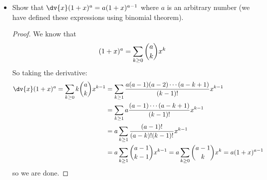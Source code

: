 \documentclass{article}
\begin{document}
\begin{itemize}
\begin{proof}
\begin{align*}
                                          &= \sum_{i \geq 0}\sum_{j \geq 1}^{i} (j)a_{j}b_{i - j + 1}x^{i}
                    \end{align*}
                so 
                    \begin{align*}
                        F(x)G^{\prime}(x) + F^{\prime}(x)G(x) &= \sum_{i \geq 0}\sum_{j \geq 0}^{i}(i - j + 1)a_{j}b_{i - j + 1}x^{i} + \sum_{i \geq 0}\sum_{j \geq 1}^{i}(j)a_{j}b_{i - j + 1}x^{i} \\
                        &= \sum_{i \geq 0}\sum_{j \geq 0}^{i}(i + 1)a_{j}b_{i - j + 1}x^{i} \\
                        &= \sum_{i \geq 0}\sum_{j \geq 0}^{i} (i)a_{j}b_{i - j}x^{i - 1} = \dv{x}F(x)G(x)
                    \end{align*}
                so we are done.
            \end{proof}


        \item Show that $\dv{x}(1 + x)^{a} = a(1 + x)^{a - 1}$ where $a$ is an arbitrary number (we have defined these expressions using binomial theorem). 
            \begin{proof}
                We know that 
                    \begin{equation*}
                        (1 + x)^{a} = \sum_{k \geq 0} \dbinom{a}{k} x^{k}
                    \end{equation*}
                So taking the derivative:
                    \begin{align*}
                        \dv{x}(1 + x)^{a} = \sum_{k \geq 0}k\dbinom{a}{k}x^{k - 1} &= \sum_{k \geq 1}\dfrac{a (a - 1)(a - 2) \cdots (a - k + 1)}{(k - 1)!}x^{k - 1} \\
                                                                                   &= \sum_{k \geq 1}a \dfrac{(a - 1) \cdots (a - k + 1)}{(k - 1)!}x^{k - 1} \\
                                                                                   &= a\sum_{k \geq 1} \dfrac{(a - 1)!}{(a - k)!(k - 1)!} x^{k - 1} \\
                                                                                   &= a \sum_{k \geq 1} \dbinom{a - 1}{k - 1} x^{k - 1} =  a\sum_{k \geq 0}\dbinom{a - 1}{k}x^{k} = a(1 + x)^{a - 1}
                    \end{align*}
                so we are done.
            \end{proof}
    \end{itemize}
\end{document}
